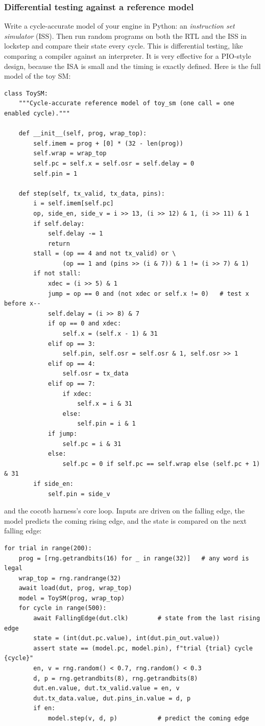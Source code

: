 \subsubsection{Differential testing against a reference model}
Write a cycle-accurate model of your engine in Python: an \emph{instruction
set simulator} (ISS). Then run random programs on both the RTL and the ISS
in lockstep and compare their state every cycle. This is differential
testing, like comparing a compiler against an interpreter. It is very
effective for a PIO-style design, because the ISA is small and the timing
is exactly defined. Here is the full model of the toy SM:
{\small
\begin{verbatim}
class ToySM:
    """Cycle-accurate reference model of toy_sm (one call = one enabled cycle)."""

    def __init__(self, prog, wrap_top):
        self.imem = prog + [0] * (32 - len(prog))
        self.wrap = wrap_top
        self.pc = self.x = self.osr = self.delay = 0
        self.pin = 1

    def step(self, tx_valid, tx_data, pins):
        i = self.imem[self.pc]
        op, side_en, side_v = i >> 13, (i >> 12) & 1, (i >> 11) & 1
        if self.delay:
            self.delay -= 1
            return
        stall = (op == 4 and not tx_valid) or \
                (op == 1 and (pins >> (i & 7)) & 1 != (i >> 7) & 1)
        if not stall:
            xdec = (i >> 5) & 1
            jump = op == 0 and (not xdec or self.x != 0)   # test x before x--
            self.delay = (i >> 8) & 7
            if op == 0 and xdec:
                self.x = (self.x - 1) & 31
            elif op == 3:
                self.pin, self.osr = self.osr & 1, self.osr >> 1
            elif op == 4:
                self.osr = tx_data
            elif op == 7:
                if xdec:
                    self.x = i & 31
                else:
                    self.pin = i & 1
            if jump:
                self.pc = i & 31
            else:
                self.pc = 0 if self.pc == self.wrap else (self.pc + 1) & 31
        if side_en:
            self.pin = side_v
\end{verbatim}
}
and the cocotb harness's core loop. Inputs are driven on the falling edge,
the model predicts the coming rising edge, and the state is compared on the
next falling edge:
{\small
\begin{verbatim}
for trial in range(200):
    prog = [rng.getrandbits(16) for _ in range(32)]   # any word is legal
    wrap_top = rng.randrange(32)
    await load(dut, prog, wrap_top)
    model = ToySM(prog, wrap_top)
    for cycle in range(500):
        await FallingEdge(dut.clk)        # state from the last rising edge
        state = (int(dut.pc.value), int(dut.pin_out.value))
        assert state == (model.pc, model.pin), f"trial {trial} cycle {cycle}"
        en, v = rng.random() < 0.7, rng.random() < 0.3
        d, p = rng.getrandbits(8), rng.getrandbits(8)
        dut.en.value, dut.tx_valid.value = en, v
        dut.tx_data.value, dut.pins_in.value = d, p
        if en:
            model.step(v, d, p)           # predict the coming edge
\end{verbatim}
}
